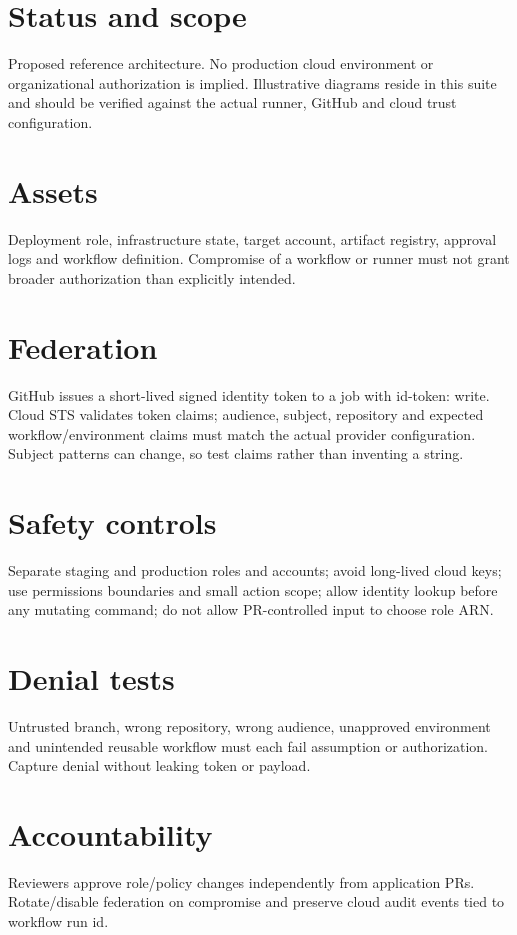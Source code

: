 \documentclass[11pt,letterpaper]{article}
\begin{document}
\makedoctitle
\makedocsummary
\tableofcontents
\clearpage
\section{Status and scope}
Proposed reference architecture. No production cloud environment or organizational authorization is implied. Illustrative diagrams reside in this suite and should be verified against the actual runner, GitHub and cloud trust configuration.

\section{Assets}
Deployment role, infrastructure state, target account, artifact registry, approval logs and workflow definition. Compromise of a workflow or runner must not grant broader authorization than explicitly intended.

\section{Federation}
GitHub issues a short-lived signed identity token to a job with id-token: write. Cloud STS validates token claims; audience, subject, repository and expected workflow/environment claims must match the actual provider configuration. Subject patterns can change, so test claims rather than inventing a string.

\section{Safety controls}
Separate staging and production roles and accounts; avoid long-lived cloud keys; use permissions boundaries and small action scope; allow identity lookup before any mutating command; do not allow PR-controlled input to choose role ARN.

\section{Denial tests}
Untrusted branch, wrong repository, wrong audience, unapproved environment and unintended reusable workflow must each fail assumption or authorization. Capture denial without leaking token or payload.

\section{Accountability}
Reviewers approve role/policy changes independently from application PRs. Rotate/disable federation on compromise and preserve cloud audit events tied to workflow run id.
\end{document}
